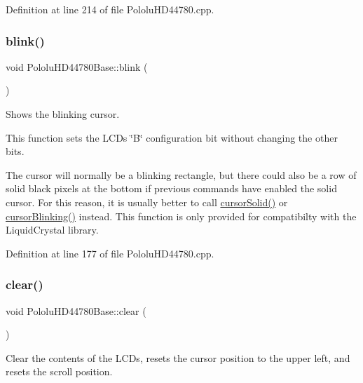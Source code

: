 Definition at line 214 of file Pololu\+H\+D44780.\+cpp.

\mbox{\label{class_pololu_h_d44780_base_ac6e255adf32d5c70c0163422b1ae8e0c}} 
\subsubsection{\texorpdfstring{blink()}{blink()}}
{\footnotesize\ttfamily void Pololu\+H\+D44780\+Base\+::blink (\begin{DoxyParamCaption}{ }\end{DoxyParamCaption})\hspace{0.3cm}{\ttfamily [inherited]}}

Shows the blinking cursor.

This function sets the L\+CD\textquotesingle{}s \char`\"{}\+B\char`\"{} configuration bit without changing the other bits.

The cursor will normally be a blinking rectangle, but there could also be a row of solid black pixels at the bottom if previous commands have enabled the solid cursor. For this reason, it is usually better to call \hyperlink{class_pololu_h_d44780_base_a6a4d8e79beda9f7c81659a8e13c8c338}{cursor\+Solid()} or \hyperlink{class_pololu_h_d44780_base_a6a53a6cffbb77953b5a2c4ae49e288de}{cursor\+Blinking()} instead. This function is only provided for compatibilty with the Liquid\+Crystal library. 

Definition at line 177 of file Pololu\+H\+D44780.\+cpp.

\mbox{\label{class_pololu_h_d44780_base_a4d35e9a47ceef1a7582e180165e0eae1}} 
\subsubsection{\texorpdfstring{clear()}{clear()}}
{\footnotesize\ttfamily void Pololu\+H\+D44780\+Base\+::clear (\begin{DoxyParamCaption}{ }\end{DoxyParamCaption})\hspace{0.3cm}{\ttfamily [inherited]}}

Clear the contents of the L\+C\+Ds, resets the cursor position to the upper left, and resets the scroll position. 

